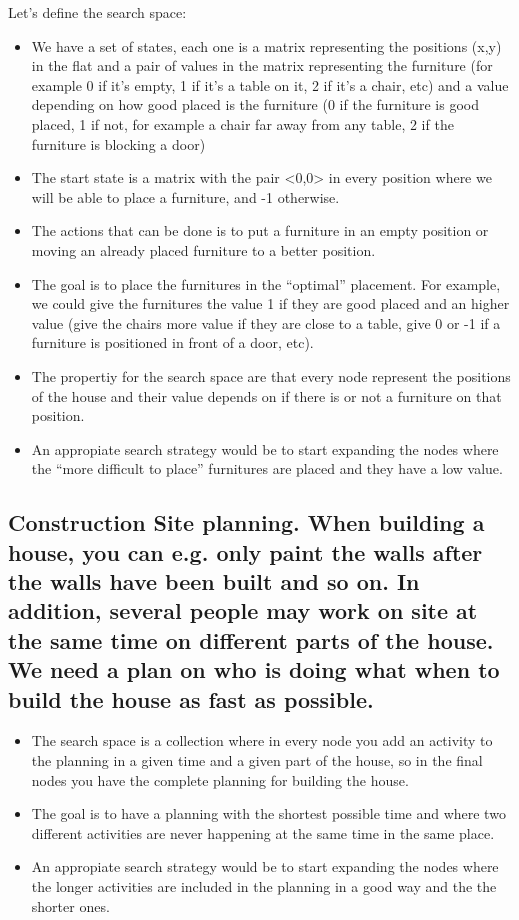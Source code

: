 \documentclass[paper=a4, fontsize=11pt]{scrartcl} %
\numberwithin{equation}{section} %
\numberwithin{figure}{section} %
\numberwithin{table}{section} %
\begin{document}
Let's define the search space:

\begin{itemize}
	\item We have a set of states, each one is a matrix representing the positions (x,y)  in the flat and a pair of values in the matrix representing the furniture (for example 0 if it's empty, 1 if it's a table on it, 2 if it's a chair, etc) and a value depending on how good placed is the furniture (0 if the furniture is good placed, 1 if not, for example a chair far away from any table, 2 if the furniture is blocking a door)
	\item The start state is a matrix with the pair <0,0> in every position where we will be able to place a furniture, and -1 otherwise.
	\item The actions that can be done is to put a furniture in an empty position or moving an already placed furniture to a better position.
	\item The goal is to place the furnitures in the “optimal” placement. For example, we could give the furnitures the value 1 if they are good placed and an higher value (give the chairs more value if they are close to a table, give 0 or -1 if a furniture is positioned in front of a door, etc). 
	\item The propertiy for the search space are that every node represent the positions of the house and their value depends on if there is or not a furniture on that position.
	\item An appropiate search strategy would be to start expanding the nodes where the “more difficult to place” furnitures are placed and they have a low value.
\end{itemize}


\subsection{Construction Site planning. When building a house, you can e.g. only paint the walls after the walls have been built and so on. In addition, several people may work on site at the same time on different parts of the house. We need a plan on who is doing what when to build the house as fast as possible.}

\begin{itemize}
	\item The search space is a collection where in every node you add an activity to the planning in a given time and a given part of the house, so in the final nodes you have the complete planning for building the house.
	\item The goal is to have a planning with the shortest possible time and where two different activities are never happening at the same time in the same place.
	\item An appropiate search strategy would be to start expanding the nodes where the longer activities are included in the planning in a good way and the the shorter ones.
\end{itemize}
\end{document}
